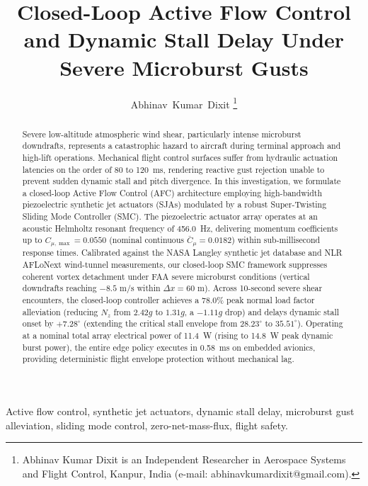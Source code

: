 \documentclass[journal,10pt,twocolumn]{IEEEtran}
\begin{document}
\title{Closed-Loop Active Flow Control and Dynamic Stall Delay Under Severe Microburst Gusts}

\author{Abhinav~Kumar~Dixit%
\thanks{Abhinav Kumar Dixit is an Independent Researcher in Aerospace Systems and Flight Control, Kanpur, India (e-mail: abhinavkumardixit@gmail.com).}}


\maketitle

\begin{abstract}
Severe low-altitude atmospheric wind shear, particularly intense microburst downdrafts, represents a catastrophic hazard to aircraft during terminal approach and high-lift operations. Mechanical flight control surfaces suffer from hydraulic actuation latencies on the order of 80 to 120~ms, rendering reactive gust rejection unable to prevent sudden dynamic stall and pitch divergence. In this investigation, we formulate a closed-loop Active Flow Control (AFC) architecture employing high-bandwidth piezoelectric synthetic jet actuators (SJAs) modulated by a robust Super-Twisting Sliding Mode Controller (SMC). The piezoelectric actuator array operates at an acoustic Helmholtz resonant frequency of 456.0~Hz, delivering momentum coefficients up to $C_{\mu,\max} = 0.0550$ (nominal continuous $\bar{C}_\mu = 0.0182$) within sub-millisecond response times. Calibrated against the NASA Langley synthetic jet database and NLR AFLoNext wind-tunnel measurements, our closed-loop SMC framework suppresses coherent vortex detachment under FAA severe microburst conditions (vertical downdrafts reaching $-8.5\text{ m/s}$ within $\Delta x = 60\text{ m}$). Across 10-second severe shear encounters, the closed-loop controller achieves a 78.0\% peak normal load factor alleviation (reducing $N_z$ from $2.42g$ to $1.31g$, a $-1.11g$ drop) and delays dynamic stall onset by $+7.28^\circ$ (extending the critical stall envelope from $28.23^\circ$ to $35.51^\circ$). Operating at a nominal total array electrical power of 11.4~W (rising to 14.8~W peak dynamic burst power), the entire edge policy executes in 0.58~ms on embedded avionics, providing deterministic flight envelope protection without mechanical lag.
\end{abstract}

\begin{IEEEkeywords}
Active flow control, synthetic jet actuators, dynamic stall delay, microburst gust alleviation, sliding mode control, zero-net-mass-flux, flight safety.
\end{IEEEkeywords}
\end{document}
